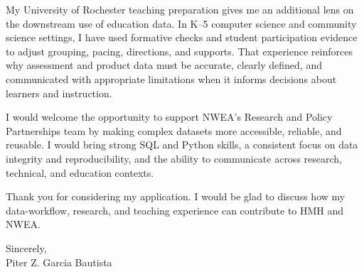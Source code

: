\documentclass[10pt,letterpaper]{article}
\begin{document}
My University of Rochester teaching preparation gives me an additional lens on
the downstream use of education data. In K--5 computer science and community
science settings, I have used formative checks and student participation
evidence to adjust grouping, pacing, directions, and supports. That experience
reinforces why assessment and product data must be accurate, clearly defined,
and communicated with appropriate limitations when it informs decisions about
learners and instruction.

I would welcome the opportunity to support NWEA's Research and Policy
Partnerships team by making complex datasets more accessible, reliable, and
reusable. I would bring strong SQL and Python skills, a consistent focus on
data integrity and reproducibility, and the ability to communicate across
research, technical, and education contexts.

Thank you for considering my application. I would be glad to discuss how my
data-workflow, research, and teaching experience can contribute to HMH and
NWEA.

Sincerely,\\[10pt]
Piter Z. Garcia Bautista
\end{document}
